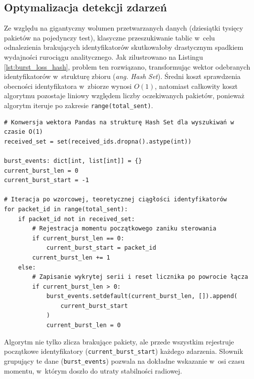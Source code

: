 \subsection{Optymalizacja detekcji zdarzeń}

Ze względu na gigantyczny wolumen przetwarzanych danych (dziesiątki tysięcy pakietów na pojedynczy test), klasyczne przeszukiwanie tablic w~celu odnalezienia brakujących identyfikatorów skutkowałoby drastycznym spadkiem wydajności rurociągu analitycznego.
Jak zilustrowano na Listingu \ref{lst:burst_loss_hash}, problem ten rozwiązano, transformując wektor odebranych identyfikatorów w~strukturę zbioru (\textit{ang. Hash Set}).
Średni koszt sprawdzenia obecności identyfikatora w~zbiorze wynosi $O(1)$, natomiast całkowity koszt algorytmu pozostaje liniowy względem liczby oczekiwanych pakietów, ponieważ algorytm iteruje po zakresie \texttt{range(total\_sent)}.

\begin{listing}[htbp]
    \caption{Wydajny algorytm detekcji zdarzeń Burst Loss z~wykorzystaniem struktury zbiorów o~złożoności stałej $O(1)$ (\texttt{burst\_loss.py}) \cite{espy_nexus_python_host}.}
    \label{lst:burst_loss_hash}
    \begin{verbatim}
# Konwersja wektora Pandas na strukturę Hash Set dla wyszukiwań w czasie O(1)
received_set = set(received_ids.dropna().astype(int))

burst_events: dict[int, list[int]] = {}
current_burst_len = 0
current_burst_start = -1

# Iteracja po wzorcowej, teoretycznej ciągłości identyfikatorów
for packet_id in range(total_sent):
    if packet_id not in received_set:
        # Rejestracja momentu początkowego zaniku sterowania
        if current_burst_len == 0:
            current_burst_start = packet_id
        current_burst_len += 1
    else:
        # Zapisanie wykrytej serii i reset licznika po powrocie łącza
        if current_burst_len > 0:
            burst_events.setdefault(current_burst_len, []).append(
                current_burst_start
            )
            current_burst_len = 0
\end{verbatim}
\end{listing}

Algorytm nie tylko zlicza brakujące pakiety, ale przede wszystkim rejestruje początkowe identyfikatory (\texttt{current\_burst\_start}) każdego zdarzenia.
Słownik grupujący te dane (\texttt{burst\_events}) pozwala na dokładne wskazanie w~osi czasu momentu, w~którym doszło do utraty stabilności radiowej.


